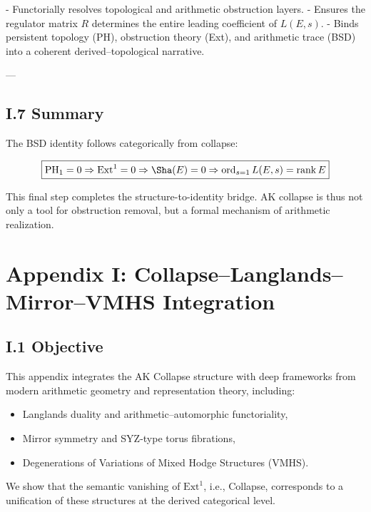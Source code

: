 - Functorially resolves topological and arithmetic obstruction layers.
- Ensures the regulator matrix \( R \) determines the entire leading coefficient of \( L(E,s) \).
- Binds persistent topology (PH), obstruction theory (Ext), and arithmetic trace (BSD) into a coherent derived–topological narrative.

---

\subsection*{I.7 Summary}

The BSD identity follows categorically from collapse:

\[
\boxed{
\mathrm{PH}_1 = 0 \Rightarrow \mathrm{Ext}^1 = 0 \Rightarrow \Sha(E) = 0 \Rightarrow \operatorname{ord}_{s=1} L(E,s) = \operatorname{rank} E
}
\]

This final step completes the structure-to-identity bridge.  
AK collapse is thus not only a tool for obstruction removal,  
but a formal mechanism of arithmetic realization.



\section*{Appendix I: Collapse–Langlands–Mirror–VMHS Integration}

\subsection*{I.1 Objective}

This appendix integrates the AK Collapse structure  
with deep frameworks from modern arithmetic geometry and representation theory, including:

\begin{itemize}
  \item Langlands duality and arithmetic–automorphic functoriality,
  \item Mirror symmetry and SYZ-type torus fibrations,
  \item Degenerations of Variations of Mixed Hodge Structures (VMHS).
\end{itemize}

We show that the semantic vanishing of \( \mathrm{Ext}^1 \), i.e., Collapse,  
corresponds to a unification of these structures at the derived categorical level.

